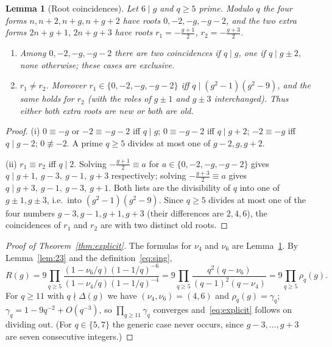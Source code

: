 \documentclass[11pt,a4paper]{article}
\theoremstyle{plain}
\newtheorem{lemma}[theorem]{Lemma}
\theoremstyle{definition}
\theoremstyle{remark}
\begin{document}
\begin{lemma}[Root coincidences]\label{lem:roots}
Let $6\mid g$ and $q\ge5$ prime.  Modulo $q$ the four forms
$n,n+2,n+g,n+g+2$ have roots $0,-2,-g,-g-2$, and the two extra forms
$2n+g+1,\,2n+g+3$ have roots $r_1=-\tfrac{g+1}2$, $r_2=-\tfrac{g+3}2$.
\begin{enumerate}
\item[(i)] Among $0,-2,-g,-g-2$ there are two coincidences if $q\mid g$,
one if $q\mid g\pm2$, none otherwise; these cases are exclusive.
\item[(ii)] $r_1\neq r_2$.  Moreover
$r_1\in\{0,-2,-g,-g-2\}$ iff $q\mid(g^2-1)(g^2-9)$, and the same holds for
$r_2$ (with the roles of $g\pm1$ and $g\pm3$ interchanged).  Thus either
both extra roots are new or both are old.
\end{enumerate}
\end{lemma}
\begin{proof}
(i) $0\equiv-g$ or $-2\equiv-g-2$ iff $q\mid g$; $0\equiv-g-2$ iff
$q\mid g+2$; $-2\equiv-g$ iff $q\mid g-2$; $0\not\equiv-2$.  A prime
$q\ge5$ divides at most one of $g-2,g,g+2$.

(ii) $r_1\equiv r_2$ iff $q\mid 2$.  Solving $-\frac{g+1}2\equiv a$ for
$a\in\{0,-2,-g,-g-2\}$ gives $q\mid g+1,\ g-3,\ g-1,\ g+3$ respectively;
solving $-\frac{g+3}2\equiv a$ gives $q\mid g+3,\ g-1,\ g-3,\ g+1$.  Both
lists are the divisibility of $q$ into one of $g\pm1,g\pm3$, i.e.\ into
$(g^2-1)(g^2-9)$.  Since $q\ge5$ divides at most one of the four numbers
$g-3,g-1,g+1,g+3$ (their differences are $2,4,6$), the coincidences of $r_1$
and $r_2$ are with two distinct old roots.
\end{proof}

\begin{proof}[Proof of Theorem~\ref{thm:explicit}]
The formulas for $\nu_4$ and $\nu_6$ are Lemma~\ref{lem:roots}.  By
Lemma~\ref{lem:23} and the definition~\eqref{eq:sing},
\[
R(g)=9\prod_{q\ge5}\frac{(1-\nu_6/q)(1-1/q)^{-6}}{(1-\nu_4/q)(1-1/q)^{-4}}
=9\prod_{q\ge5}\frac{q^2(q-\nu_6)}{(q-1)^2(q-\nu_4)}=9\prod_{q\ge5}\rho_q(g).
\]
For $q\ge11$ with $q\nmid\Delta(g)$ we have $(\nu_4,\nu_6)=(4,6)$ and
$\rho_q(g)=\gamma_q$; $\gamma_q=1-9q^{-2}+O(q^{-3})$, so
$\prod_{q\ge11}\gamma_q$ converges and~\eqref{eq:explicit} follows on
dividing out.  (For $q\in\{5,7\}$ the generic case never occurs, since
$g-3,\dots,g+3$ are seven consecutive integers.)
\end{proof}
\end{document}
